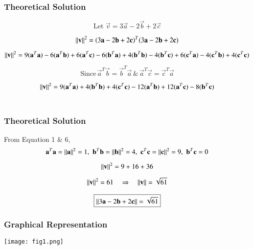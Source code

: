 \documentclass{beamer}
\begin{document}
\begin{frame}[fragile]
    \frametitle{Theoretical Solution}
\begin{equation}
\text{Let} \, \,\vec{v} = 3\vec{a} - 2\vec{b} + 2\vec{c}
\end{equation}


\begin{equation}
\left\lVert\mathbf{v}\right\rVert^2 = (3\mathbf{a} - 2\mathbf{b} + 2\mathbf{c})^T(3\mathbf{a} - 2\mathbf{b} + 2\mathbf{c})
\end{equation}

\begin{equation}
\left\lVert\mathbf{v}\right\rVert^2 = 9(\mathbf{a}^T\mathbf{a}) -6(\mathbf{a}^T\mathbf{b}) +6(\mathbf{a}^T\mathbf{c}) - 6(\mathbf{b}^T\mathbf{a}) + 4(\mathbf{b}^T\mathbf{b}) -4(\mathbf{b}^T\mathbf{c})+ 6(\mathbf{c}^T\mathbf{a}) - 4(\mathbf{c}^T\mathbf{b}) + 4(\mathbf{c}^T\mathbf{c})\\
\end{equation}


\begin{equation}
    \text{Since} \,  \vec{a}^T\vec{b} = \vec{b}^T\vec{a} \, \text{\&}
\, \vec{a}^T\vec{c} = \vec{c}^T\vec{a}
\end{equation}


\begin{equation}
\left\lVert\mathbf{v}\right\rVert^2 = 9(\mathbf{a}^T\mathbf{a}) + 4(\mathbf{b}^T\mathbf{b}) + 4(\mathbf{c}^T\mathbf{c}) - 12(\mathbf{a}^T\mathbf{b}) + 12(\mathbf{a}^T\mathbf{c}) - 8(\mathbf{b}^T\mathbf{c})
\end{equation}\\
\end{frame}

\begin{frame}[fragile]
\frametitle{Theoretical  Solution}
From Equation 1 \& 6,
\begin{equation}
\mathbf{a}^T\mathbf{a} = \left\lVert\mathbf{a}\right\rVert^2 = 1, \,\,
\mathbf{b}^T\mathbf{b} = \left\lVert\mathbf{b}\right\rVert^2 = 4, \,\,
\mathbf{c}^T\mathbf{c} = \left\lVert\mathbf{c}\right\rVert^2 = 9, \,\,
\mathbf{b}^T\mathbf{c} = 0
\end{equation}


\begin{equation}
\left\lVert\mathbf{v}\right\rVert^2 = 9 + 16 + 36
\end{equation}


\begin{align}
    \centering
    \norm{\vec{v}}^2 = 61 
    \quad \Rightarrow \quad
    \norm{\vec{v}} = \sqrt{61}
\end{align}

\begin{align}
\centering
\boxed{\norm{3\vec{a} - 2\vec{b} + 2\vec{c}} = \sqrt{61}}
\end{align}
\end{frame}


\begin{frame}
\frametitle{Graphical Representation}
\begin{center}
\texttt{[image: fig1.png]}
\end{center}
\end{frame}
\end{document}
